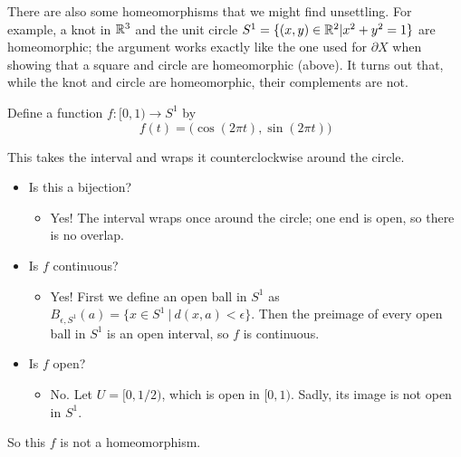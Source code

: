 There are also some homeomorphisms that we might find unsettling. For example, a knot in $\mathbb R^3$ and the unit circle $S^1 = \{ (x,y)\in\mathbb R^2 | x^2+y^2 = 1\}$ are homeomorphic; the argument works exactly like the one used for $ 
\partial X$ when showing that a square and circle are homeomorphic (above). It turns out that, while the knot and circle are homeomorphic, their complements are not. 
\begin{example}
	Define a function $f:[0,1)\to S^1$ by
	\[ f(t) = \big( \cos(2\pi t), \sin(2\pi t)\big) \]
\end{example}
This takes the interval and wraps it counterclockwise around the circle. 
\begin{itemize}
	\item Is this a bijection? 
	\begin{itemize}
		\item Yes! The interval wraps once around the circle; one end is open, so there is no overlap. 
	\end{itemize}
	
	\item Is $f$ continuous? 
	\begin{itemize}
		\item Yes! First we define an open ball in $S^1$ as $B_{\epsilon, S^1}(a) = \{x\in S^1\ |\ d(x,a) < \epsilon\}$. Then the preimage of every open ball in $S^1$ is an open interval, so $f$ is continuous. 
	\end{itemize}
	
	\item Is $f$ open? 
	\begin{itemize}
		\item No. Let $U = [0, 1/2)$, which is open in $[0,1)$. Sadly, its image is not open in $S^1$. 
	\end{itemize}
\end{itemize}
So this $f$ is not a homeomorphism.

\mbox{ }

